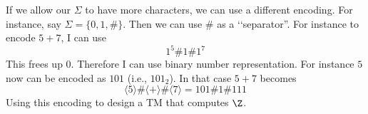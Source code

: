 If we allow our $\Sigma$ to have more characters, we can
use a different encoding.
For instance, say $\Sigma = \{0,1,\#\}$.
Then we can use $\#$ as a \lq\lq separator''.
For instance to encode $5+7$, I can use
\[
1^5 \# 1 \# 1^7
\]
This frees up $0$.
Therefore I can use binary number representation.
For instance $5$ now can be encoded as $101$ (i.e., $101_2$).
In that case $5 + 7$ becomes
\[
\langle 5 \rangle \# \langle + \rangle \# \langle 7 \rangle
= 101 \# 1 \# 111
\]
Using this encoding to design a TM that computes $\Z$.
